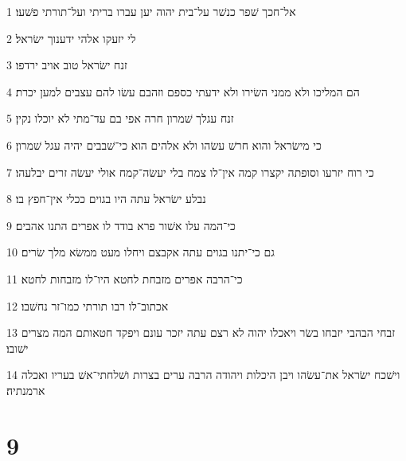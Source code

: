 \par 1 אל־חכך שׁפר כנשׁר על־בית יהוה יען עברו בריתי ועל־תורתי פשׁעו׃
\par 2 לי יזעקו אלהי ידענוך ישׂראל׃
\par 3 זנח ישׂראל טוב אויב ירדפו׃
\par 4 הם המליכו ולא ממני השׂירו ולא ידעתי כספם וזהבם עשׂו להם עצבים למען יכרת׃
\par 5 זנח עגלך שׁמרון חרה אפי בם עד־מתי לא יוכלו נקין׃
\par 6 כי מישׂראל והוא חרשׁ עשׂהו ולא אלהים הוא כי־שׁבבים יהיה עגל שׁמרון׃
\par 7 כי רוח יזרעו וסופתה יקצרו קמה אין־לו צמח בלי יעשׂה־קמח אולי יעשׂה זרים יבלעהו׃
\par 8 נבלע ישׂראל עתה היו בגוים ככלי אין־חפץ בו׃
\par 9 כי־המה עלו אשׁור פרא בודד לו אפרים התנו אהבים׃
\par 10 גם כי־יתנו בגוים עתה אקבצם ויחלו מעט ממשׂא מלך שׂרים׃
\par 11 כי־הרבה אפרים מזבחת לחטא היו־לו מזבחות לחטא׃
\par 12 אכתוב־לו רבו תורתי כמו־זר נחשׁבו׃
\par 13 זבחי הבהבי יזבחו בשׂר ויאכלו יהוה לא רצם עתה יזכר עונם ויפקד חטאותם המה מצרים ישׁובו׃
\par 14 וישׁכח ישׂראל את־עשׂהו ויבן היכלות ויהודה הרבה ערים בצרות ושׁלחתי־אשׁ בעריו ואכלה ארמנתיה׃

\chapter{9}

